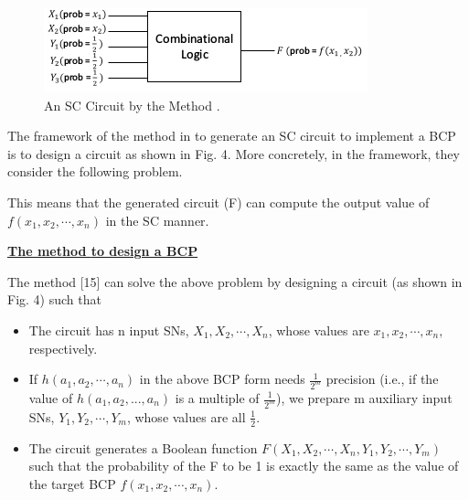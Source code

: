 \documentclass[10pt,conference]{IEEEtran}
\begin{document}
\begin{figure}[ht]
\begin{center}
    \setcounter{figure}{3}
    \includegraphics[width=.4\textwidth]{fig4.png}
    \caption{ An SC Circuit by the Method \cite{fifteen}.}
\end{center}
\end{figure}

The framework of the method in \cite{fifteen} to generate an SC circuit to implement a BCP is to design a circuit as shown in Fig. 4. More concretely, in the framework, they consider the following problem.
\smallskip
{}   


This means that the generated circuit (F) can compute the
output value of $f(x_1, x_2, \cdots , x_n)$ in the SC manner.

\noindent
\underline{\textbf{The method \cite{fifteen} to design a BCP}}
\par
The method [15] can solve the above problem by designing
a circuit (as shown in Fig. 4) such that \\
\begin{itemize}
  \item The circuit has n input SNs, $X_1, X_2, \cdots , X_n$, whose
values are $x_1, x_2, \cdots , x_n,$ respectively.
  \item If $h(a_1, a_2, \cdots , a_n)$ in the above BCP form needs $\frac{1}{2^m}$ precision (i.e., if the value of $h(a_1, a_2, ... , a_n)$ is a multiple of $\frac{1}{2^m}$), we prepare m auxiliary input SNs, $Y_1, Y_2, \cdots , Y_m$, whose values are all $\frac{1}{2}$.
  \item The circuit generates a Boolean function $F(X_1, X_2, \cdots , X_n, Y_1, Y_2, \cdots , Y_m)$ such that the probability of the F to be 1 is exactly the same as the value of the target BCP $f(x_1, x_2, \cdots , x_n)$.

\end{itemize}
\end{document}
